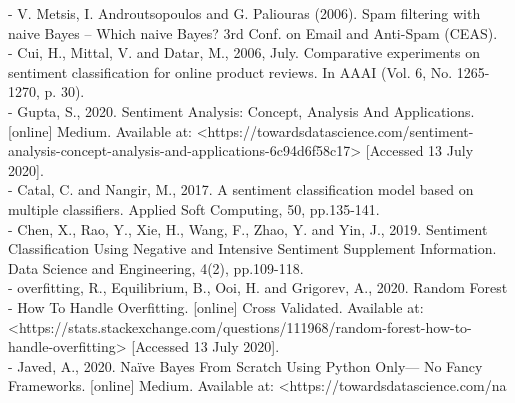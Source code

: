 \documentclass[12pt]{report}
\begin{document}
	- V. Metsis, I. Androutsopoulos and G. Paliouras (2006). Spam filtering with naive Bayes – Which naive Bayes? 3rd Conf. on Email and Anti-Spam (CEAS).\\
	
	- Cui, H., Mittal, V. and Datar, M., 2006, July. Comparative experiments on sentiment classification for online product reviews. In AAAI (Vol. 6, No. 1265-1270, p. 30).\\
	
	- Gupta, S., 2020. Sentiment Analysis: Concept, Analysis And Applications. [online] Medium. Available at: <https://towardsdatascience.com/sentiment-analysis-concept-analysis-and-applications-6c94d6f58c17> [Accessed 13 July 2020].\\
	
	- Catal, C. and Nangir, M., 2017. A sentiment classification model based on multiple classifiers. Applied Soft Computing, 50, pp.135-141.\\
	
	- Chen, X., Rao, Y., Xie, H., Wang, F., Zhao, Y. and Yin, J., 2019. Sentiment Classification Using Negative and Intensive Sentiment Supplement Information. Data Science and Engineering, 4(2), pp.109-118.\\
	
	- overfitting, R., Equilibrium, B., Ooi, H. and Grigorev, A., 2020. Random Forest - How To Handle Overfitting. [online] Cross Validated. Available at: <https://stats.stackexchange.com/questions/111968/random-forest-how-to-handle-overfitting> [Accessed 13 July 2020].\\
	
	- Javed, A., 2020. Naïve Bayes From Scratch Using Python Only— No Fancy Frameworks. [online] Medium. Available at: <https://towardsdatascience.com/na%
	
	
\end{document}
